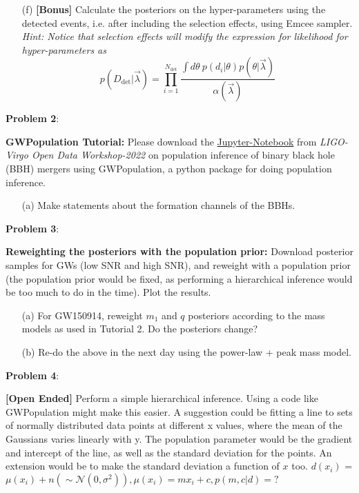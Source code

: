\documentclass{article} %
\newcommand{\question}[2][]{\begin{flushleft}
        \textbf{Problem #1}: %
\end{flushleft}
}
\begin{document}
\begin{enumerate}
    \item[(f)] \textbf{[Bonus]} Calculate the posteriors on the hyper-parameters using the detected events, i.e. after including the selection effects, using Emcee sampler. \textit{Hint: Notice that selection effects will modify the expression for likelihood for hyper-parameters as}
    \begin{equation}
        p(D_{\mathrm{det}}|\Vec{\lambda}) =  \prod_{i=1}^{N_{\mathrm{det}}} \frac{\int d \theta \ p(d_i|\theta) p(\theta|\Vec{\lambda})}{\alpha(\Vec{\lambda})}
    \end{equation}

    \end{enumerate}

    \question[2]{} \textbf{GWPopulation Tutorial:} Please download the \href{https://github.com/gw-odw/odw-2022/blob/main/Tutorials/Advanced_topics/Tuto_A.2_Population_Inference_with_GWPopulation.ipynb}{Jupyter-Notebook} from \textit{LIGO-Virgo Open Data Workshop-2022} on population inference of binary black hole (BBH) mergers using GWPopulation, a python package for doing population inference.
    \begin{enumerate}
        \item[(a)] Make statements about the formation channels of the BBHs. 
    \end{enumerate}
    
    \question[3]{} 
    \textbf{Reweighting the posteriors with the population prior:} Download posterior samples for GWs (low SNR and high SNR), and reweight with a population prior (the population prior would be fixed, as performing a hierarchical inference would be too much to do in the time). Plot the results.
    \begin{enumerate}
        \item[(a)] For GW150914, reweight $m_1$ and $q$ posteriors according to the mass models as used in Tutorial 2. Do the posteriors change?
        \item[(b)] Re-do the above in the next day using the power-law + peak mass model.
    \end{enumerate}
    
    \question[4]{} \textbf{[Open Ended]}
    Perform a simple hierarchical inference. Using a code like GWPopulation might make this easier. A suggestion could be fitting a line to sets of normally distributed data points at different x values, where the mean of the Gaussians varies linearly with y. The population parameter would be the gradient and intercept of the line, as well as the standard deviation for the points. An extension would be to make the standard deviation a function of $x$ too. $d(x_i)$ = $\mu(x_i) + n( \sim \mathcal{N}(0, \sigma^2)) , \mu(x_i) = m x_i + c,   p(m,c|d)=?$
\end{document}
